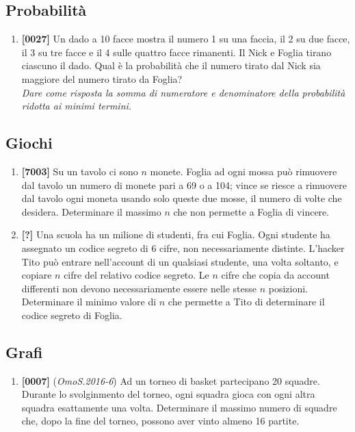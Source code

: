 \documentclass[10pt]{article}
\begin{document}
\subsection{Probabilità}
\begin{enumerate}
    \item \textbf{[0027]} Un dado a 10 facce mostra il numero 1 su una faccia, il 2 su due facce, il 3 su tre facce e il 4 sulle quattro facce rimanenti. Il Nick e Foglia tirano ciascuno il dado. Qual è la probabilità che il numero tirato dal Nick sia maggiore del numero tirato da Foglia?\\
    \textit{Dare come risposta la somma di numeratore e denominatore della probabilità ridotta ai minimi termini.}

\end{enumerate}

\subsection{Giochi}
\begin{enumerate}
    \item \textbf{[7003]} Su un tavolo ci sono $n$ monete. Foglia ad ogni mossa può rimuovere dal tavolo un numero di monete pari a 69 o a 104; vince se riesce a rimuovere dal tavolo ogni moneta usando solo queste due mosse, il numero di volte che desidera. Determinare il massimo $n$ che non permette a Foglia di vincere.

    \item \textbf{[?]} Una scuola ha un milione di studenti, fra cui Foglia. Ogni studente ha assegnato un codice segreto di 6 cifre, non necessariamente distinte. L'hacker Tito può entrare nell'account di un qualsiasi studente, una volta soltanto, e copiare $n$ cifre del relativo codice segreto. Le $n$ cifre che copia da account differenti non devono necessariamente essere nelle stesse $n$ posizioni. Determinare il minimo valore di $n$ che permette a Tito di determinare il codice segreto di Foglia.
\end{enumerate}

\subsection{Grafi}
\begin{enumerate}
    \item \textbf{[0007]} (\textit{OmoS.2016-6}) Ad un torneo di basket partecipano 20 squadre. Durante lo svolginmento del torneo, ogni squadra gioca con ogni altra squadra esattamente una volta. Determinare il massimo numero di squadre che, dopo la fine del torneo, possono aver vinto almeno 16 partite.
\end{enumerate}
\end{document}
